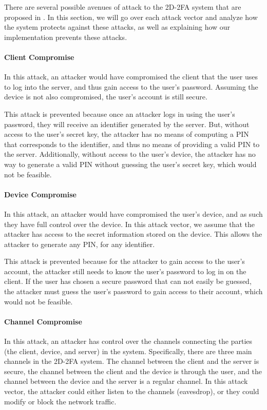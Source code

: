 \documentclass[11pt]{article}
\begin{document}
There are several possible avenues of attack to the 2D-2FA system that
are proposed in \cite{shirvanian2d2fa}. In this section, we will go over
each attack vector and analyze how the system protects against these
attacks, as well as explaining how our implementation prevents these
attacks. 

\paragraph{Client Compromise}
In this attack, an attacker would have compromised the client that the
user uses to log into the server, and thus gain access to the user's
password. Assuming the device is not also compromised, the user's
account is still secure. 

This attack is prevented because once an attacker logs in using the
user's password, they will receive an identifier generated by the
server. But, without access to the user's secret key, the attacker has
no means of computing a PIN that corresponds to the identifier, and
thus no means of providing a valid PIN to the server. Additionally,
without access to the user's device, the attacker has no way to generate
a valid PIN without guessing the user's secret key, which would not be
feasible. 


\paragraph{Device Compromise}
In this attack, an attacker would have compromised the user's device,
and as such they have full control over the device. In this attack
vector, we assume that the attacker has access to the secret information
stored on the device. This allows the attacker to generate any PIN, for
any identifier.

This attack is prevented because for the attacker to gain access to the
user's account, the attacker still needs to know the user's password to
log in on the client. If the user has chosen a secure password that can
not easily be guessed, the attacker must guess the user's password to
gain access to their account, which would not be feasible. 


\paragraph{Channel Compromise}
In this attack, an attacker has control over the channels connecting the
parties (the client, device, and server) in the system. Specifically,
there are three main channels in the 2D-2FA system. The channel between
the client and the server is secure, the channel between the client and
the device is through the user, and the channel between the device and
the server is a regular channel. In this attack vector, the attacker
could either listen to the channels (eavesdrop), or they could modify or
block the network traffic. 
\end{document}
